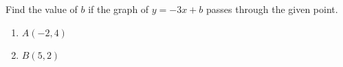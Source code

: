Find the value of $b$ if the graph of $y=-3x+b$ passes through the given point.
\begin{enumerate}
\item[(a)] $A(-2,4)$
\item[(b)] $B(5,2)$
\end{enumerate}
